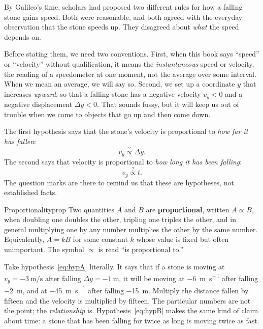 \documentclass[11pt,twoside,openany]{book}
\begin{document}
By Galileo's time, scholars had proposed two different rules for how a falling stone gains speed. Both were reasonable, and both agreed with the everyday observation that the stone speeds up. They disagreed about \emph{what} the speed depends on.

Before stating them, we need two conventions. First, when this book says ``speed'' or ``velocity'' without qualification, it means the \emph{instantaneous} speed or velocity, the reading of a speedometer at one moment, not the average over some interval. When we mean an average, we will say so. Second, we set up a coordinate $y$ that increases \emph{upward}, so that a falling stone has a negative velocity $v_y < 0$ and a negative displacement $\Delta y < 0$. That sounds fussy, but it will keep us out of trouble when we come to objects that go up and then come down.

The first hypothesis says that the stone's velocity is proportional to \emph{how far it has fallen}:
\begin{equation}
v_y \overset{?}{\propto} \Delta y.
\label{eq:hypA}
\end{equation}
The second says that velocity is proportional to \emph{how long it has been falling}:
\begin{equation}
v_y \overset{?}{\propto} t.
\label{eq:hypB}
\end{equation}
The question marks are there to remind us that these are hypotheses, not established facts.

\begin{definition}{Proportionality}{prop}
Two quantities $A$ and $B$ are \textbf{proportional}, written $A \propto B$, when doubling one doubles the other, tripling one triples the other, and in general multiplying one by any number multiplies the other by the same number. Equivalently, $A = kB$ for some constant $k$ whose value is fixed but often unimportant. The symbol $\propto$ is read ``is proportional to.''
\end{definition}

Take hypothesis~\eqref{eq:hypA} literally. It says that if a stone is moving at $v_y = \SI{-3}{\metre\per\second}$ after falling $\Delta y = \SI{-1}{\metre}$, it will be moving at \SI{-6}{\metre\per\second} after falling \SI{-2}{\metre}, and at \SI{-45}{\metre\per\second} after falling \SI{-15}{\metre}. Multiply the distance fallen by fifteen and the velocity is multiplied by fifteen. The particular numbers are not the point; the \emph{relationship} is. Hypothesis~\eqref{eq:hypB} makes the same kind of claim about time: a stone that has been falling for twice as long is moving twice as fast.
\end{document}
